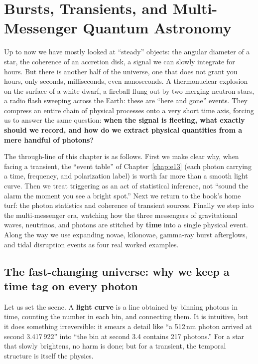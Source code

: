 \chapter{Bursts, Transients, and Multi-Messenger Quantum Astronomy}
\label{chap:e20}

\begin{chapteropening}
Up to now we have mostly looked at ``steady'' objects: the angular diameter of a star, the coherence of an accretion disk, a signal we can slowly integrate for hours. But there is another half of the universe, one that does not grant you hours, only seconds, milliseconds, even nanoseconds. A thermonuclear explosion on the surface of a white dwarf, a fireball flung out by two merging neutron stars, a radio flash sweeping across the Earth: these are ``here and gone'' events. They compress an entire chain of physical processes onto a very short time axis, forcing us to answer the same question: \textbf{when the signal is fleeting, what exactly should we record, and how do we extract physical quantities from a mere handful of photons?}

The through-line of this chapter is as follows. First we make clear why, when facing a transient, the ``event table'' of Chapter~\ref{chap:e13} (each photon carrying a time, frequency, and polarization label) is worth far more than a smooth light curve. Then we treat triggering as an act of statistical inference, not ``sound the alarm the moment you see a bright spot.'' Next we return to the book's home turf: the photon statistics and coherence of transient sources. Finally we step into the multi-messenger era, watching how the three messengers of gravitational waves, neutrinos, and photons are stitched by \textbf{time} into a single physical event. Along the way we use expanding novae, kilonovae, gamma-ray burst afterglows, and tidal disruption events as four real worked examples.
\end{chapteropening}

\section{The fast-changing universe: why we keep a time tag on every photon}
\label{sec:e20-fast}

Let us set the scene. A \textbf{light curve} is a line obtained by binning photons in time, counting the number in each bin, and connecting them. It is intuitive, but it does something irreversible: it smears a detail like ``a 512\,nm photon arrived at second 3.417\,922'' into ``the bin at second 3.4 contains 217 photons.'' For a star that slowly brightens, no harm is done; but for a transient, the temporal structure is itself the physics.


